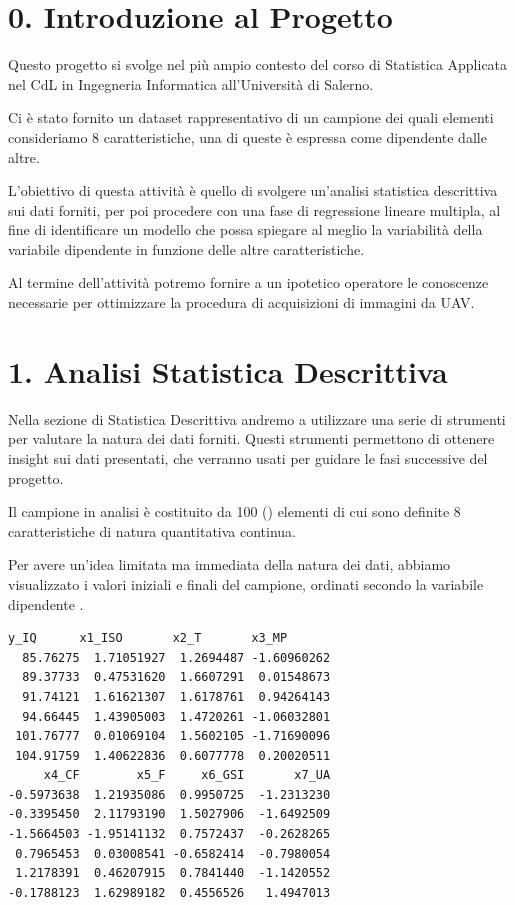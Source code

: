 
\section{0. Introduzione al Progetto}
\label{sec:0-introduzione-al-progetto}

Questo progetto si svolge nel più ampio contesto del corso di Statistica Applicata nel CdL in Ingegneria Informatica all'Università di Salerno.

Ci è stato fornito un dataset rappresentativo di un campione dei quali elementi consideriamo 8 caratteristiche, una di queste è espressa come dipendente dalle altre.

L'obiettivo di questa attività è quello di svolgere un'analisi statistica descrittiva sui dati forniti, per poi procedere con una fase di regressione lineare multipla, al fine di identificare un modello che possa spiegare al meglio la variabilità della variabile dipendente in funzione delle altre caratteristiche.

Al termine dell'attività potremo fornire a un ipotetico operatore le conoscenze necessarie per ottimizzare la procedura di acquisizioni di immagini da UAV.

\section{1. Analisi Statistica Descrittiva}
\label{sec:1-analisi-statistica-descrittiva}

Nella sezione di Statistica Descrittiva andremo a utilizzare una serie di strumenti per valutare la natura dei dati forniti. Questi strumenti permettono di ottenere insight sui dati presentati, che verranno usati per guidare le fasi successive del progetto.

Il campione in analisi è costituito da 100 (\texttt{}) elementi di cui sono definite 8 caratteristiche di natura quantitativa continua.

Per avere un'idea limitata ma immediata della natura dei dati, abbiamo visualizzato i valori iniziali e finali del campione, ordinati secondo la variabile dipendente \texttt{}.

\begin{lstlisting}[style=rconsole,caption={head(twist\_sorted)}]
      y_IQ      x1_ISO       x2_T       x3_MP
  85.76275  1.71051927  1.2694487 -1.60960262
  89.37733  0.47531620  1.6607291  0.01548673
  91.74121  1.61621307  1.6178761  0.94264143
  94.66445  1.43905003  1.4720261 -1.06032801
 101.76777  0.01069104  1.5602105 -1.71690096
 104.91759  1.40622836  0.6077778  0.20020511
     x4_CF        x5_F     x6_GSI       x7_UA
-0.5973638  1.21935086  0.9950725  -1.2313230
-0.3395450  2.11793190  1.5027906  -1.6492509
-1.5664503 -1.95141132  0.7572437  -0.2628265
 0.7965453  0.03008541 -0.6582414  -0.7980054
 1.2178391  0.46207915  0.7841440  -1.1420552
-0.1788123  1.62989182  0.4556526   1.4947013
\end{lstlisting}

